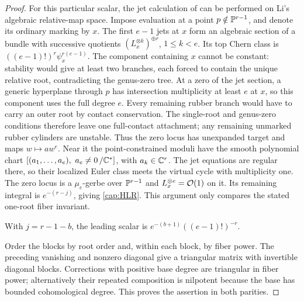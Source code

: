 \begin{proof}
For this particular scalar, the jet calculation of
\cite[Lemmas~7.2--7.4]{HLR2008} can be performed on Li's algebraic
relative-map space. Impose evaluation at a point $p\notin\mathbb P^{r-1}$,
and denote its ordinary marking by $x$. The first $e-1$ jets at $x$
form an algebraic section of a bundle with successive quotients
$(L_x^{\otimes k})^{\oplus r}$, $1\leq k<e$. Its top Chern class is
$((e-1)!)^r\psi_x^{r(e-1)}$. The component containing $x$ cannot be
constant: stability would give at least two branches, each forced to
contain the unique relative root, contradicting the genus-zero tree.
At a zero of the jet section, a generic hyperplane through $p$ has
intersection multiplicity at least $e$ at $x$, so this component uses
the full degree $e$. Every remaining rubber branch would have to
carry an outer root by contact conservation. The single-root and
genus-zero conditions therefore leave one full-contact attachment;
any remaining unmarked rubber cylinders are unstable. Thus the zero
locus has unexpanded target and maps $w\mapsto a w^e$. Near it the
point-constrained moduli have the smooth polynomial chart
$[(a_1,\ldots,a_e),\ a_e\ne0\,/\mathbb C^*]$, with $a_k\in\mathbb C^r$.
The jet equations are regular there, so their localized Euler class
meets the virtual cycle with multiplicity one. The zero locus is a
$\mu_e$-gerbe over $\mathbb P^{r-1}$ and $L_x^{\otimes e}=\mathcal O(1)$ on it.
Its remaining integral is $e^{-(r-j)}$, giving \eqref{cap:HLR}.
This argument only compares the stated one-root fiber invariant.

With $j=r-1-b$, the leading scalar is
$e^{-(b+1)}((e-1)!)^{-r}$.

Order the blocks by root order and, within each block, by fiber power.
The preceding vanishing and nonzero diagonal give a triangular matrix
with invertible diagonal blocks.  Corrections with positive base degree
are triangular in fiber power; alternatively their repeated composition
is nilpotent because the base has bounded cohomological degree.
This proves the assertion in both parities.
\end{proof}

